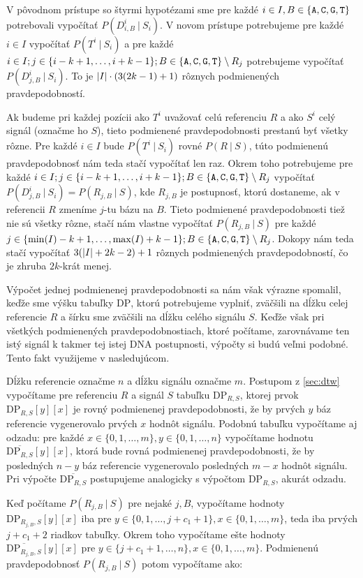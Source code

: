 V pôvodnom prístupe so štyrmi hypotézami sme pre každé $i \in I, B \in \bazy$ potrebovali vypočítať 
$P(D_{i,B}^i ~|~ S_i)$. V novom prístupe potrebujeme pre každé $i \in I$ vypočítať
$P(T^i ~|~ S_i)$ a pre každé $i \in I; j \in \{i-k+1, \dots, i+k-1\}; B \in \bazy \setminus R_j$ 
potrebujeme vypočítať $P(D_{j, B}^i ~|~ S_i)$. To je $\abs*{I} \cdot (3(2k-1)+1)$ rôznych podmienených
pravdepodobností.

Ak budeme pri každej pozícii ako $T^i$ uvažovať celú referenciu $R$ a ako $S^i$ celý signál (označme
ho $S$), tieto 
podmienené pravdepodobnosti prestanú byť všetky rôzne. Pre každé $i \in I$ bude $P(T^i ~|~ S_i)$
rovné $P(R ~|~ S)$, túto podmienenú pravdepodobnosť nám teda stačí vypočítať len raz. Okrem toho
potrebujeme pre každé $i \in I; j \in \{i-k+1, \dots, i+k-1\}; B \in \bazy \setminus R_j$ vypočítať
$P(D_{j, B}^i ~|~ S_i) = P(R_{j, B} ~|~ S)$, kde $R_{j, B}$ je postupnosť, ktorú dostaneme, ak v
referencii $R$ zmeníme $j$-tu bázu na $B$. Tieto podmienené pravdepodobnosti tiež nie sú všetky rôzne,
stačí nám vlastne vypočítať $P(R_{j, B} ~|~ S)$ pre každé $j \in \{\min(I)-k+1, \dots, \max(I)+k-1\}; B 
\in \bazy \setminus R_j$. Dokopy nám teda stačí vypočítať $3(\abs*{I} + 2k -2) + 1$ rôznych podmienených 
pravdepodobností, čo je zhruba $2k$-krát menej.


Výpočet jednej podmienenej pravdepodobnosti sa nám však výrazne spomalil, keďže sme výšku tabuľky $\mathrm{DP}$, ktorú 
potrebujeme vyplniť, zväčšili na dĺžku celej referencie $R$ a šírku sme zväčšili na dĺžku celého signálu 
$S$. Keďže však pri všetkých podmienených pravdepodobnostiach, ktoré počítame, zarovnávame ten istý
signál k takmer tej istej DNA postupnosti, výpočty si budú veľmi podobné. Tento fakt využijeme v 
nasledujúcom.

Dĺžku referencie označme $n$ a dĺžku signálu označme $m$. Postupom z \ref{sec:dtw} vypočítame
pre referenciu $R$ a signál $S$
tabuľku $\mathrm{DP}_{R,S}$, ktorej prvok $\mathrm{DP}_{R,S}[y][x]$ je rovný podmienenej pravdepodobnosti,
že by prvých $y$ báz referencie vygenerovalo prvých $x$ hodnôt signálu. Podobnú tabuľku vypočítame aj
odzadu: pre každé $x \in \{0, 1, \dots, m\}, y \in \{0, 1, \dots, n\}$ vypočítame hodnotu $\overline{\mathrm{DP}_{R,S}}[y][x]$,
ktorá bude rovná podmienenej pravdepodobnosti, že by posledných $n-y$ báz referencie vygenerovalo
posledných $m-x$ hodnôt signálu. Pri výpočte $\overline{\mathrm{DP}_{R,S}}$ postupujeme analogicky s 
výpočtom $\mathrm{DP}_{R,S}$, akurát odzadu.

Keď počítame $P(R_{j, B} ~|~ S)$ pre nejaké $j, B$, vypočítame hodnoty $\mathrm{DP}_{R_{j,B},S}[y][x]$ 
iba pre $y \in \{0, 1, \dots, j+c_1+1\}, x \in \{0, 1, \dots, m\}$, teda iba prvých $j+c_1+2$ riadkov 
tabuľky. Okrem toho vypočítame ešte hodnoty $\overline{\mathrm{DP}_{R_{j,B},S}}[y][x]$ pre $y \in \{j
+c_1+1, \dots, n\}, x \in \{0, 1, \dots, m\}$. Podmienenú pravdepodobnosť $P(R_{j, B} ~|~ S)$ potom 
vypočítame ako:

